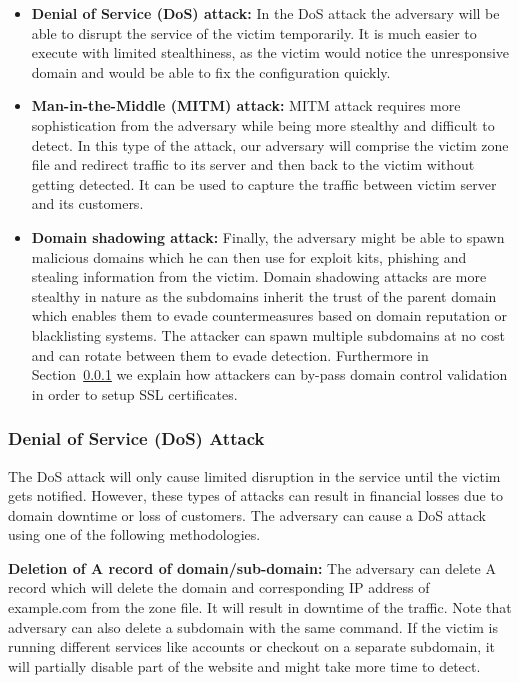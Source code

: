 \begin{itemize}
\item \textbf{Denial of Service (DoS) attack:} In the DoS attack the adversary will be able to disrupt the service of the victim temporarily. It is much easier to execute with limited stealthiness, as the victim would notice the unresponsive domain and would be able to fix the configuration quickly. 


\item \textbf{Man-in-the-Middle (MITM) attack:} MITM attack requires more sophistication from the adversary while being more stealthy and difficult to detect. In this type of the attack, our adversary will comprise the victim zone file and redirect traffic to its server and then back to the victim without getting detected. It can be used to capture the traffic between victim server and its customers.  

\item \textbf{Domain shadowing attack:} Finally, the adversary might be able to spawn malicious domains which he can then use for exploit kits, phishing and stealing information from the victim. Domain shadowing attacks are more stealthy in nature as the subdomains inherit the trust of the parent domain which enables them to evade countermeasures based on domain reputation or blacklisting systems. The attacker can spawn multiple subdomains at no cost and can rotate between them to evade detection. Furthermore in Section~\ref{} we explain how attackers can by-pass domain control validation in order to setup SSL certificates. 
\end{itemize}



\subsubsection{Denial of Service (DoS) Attack} 
The DoS attack will only cause limited disruption in the service until the victim gets notified. However, these types of attacks can result in financial losses due to domain downtime or loss of customers. The adversary can cause a DoS attack using one of the following methodologies. 

\textbf{Deletion of A record of domain/sub-domain:} The adversary can delete A record which will delete the domain and corresponding IP address of example.com from the zone file. It will result in downtime of the traffic. Note that adversary can also delete a subdomain with the same command. If the victim is running different services like accounts or checkout on a separate subdomain, it will partially disable part of the website and might take more time to detect. 

